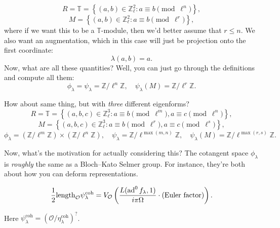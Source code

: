 \documentclass[reqno]{amsart} 
\begin{document}
\begin{example}
  \begin{equation*}
    R = \mathbb{T} = \left\{(a, b) \in \mathbb{Z}_{\ell}^2 : a \equiv b \pmod{\ell^n} \right\},
  \end{equation*}
  \begin{equation*}
    M = \left\{(a, b) \in \mathbb{Z}_{\ell}^2 : a \equiv b \pmod{\ell^r} \right\},
  \end{equation*}
  where if we want this to be a $\mathbb{T}$-module, then we'd better assume that $r \leq n$.  We also want an augmentation, which in this case will just be projection onto the first coordinate:
  \begin{equation*}
    \lambda(a, b) = a.
  \end{equation*}
  Now, what are all these quantities?  Well, you can just go through the definitions and compute all them:
  \begin{equation*}
    \phi_\lambda = \psi_\lambda = \mathbb{Z} / \ell^n \mathbb{Z}, \quad
    \psi_\lambda(M) = \mathbb{Z} / \ell^r \mathbb{Z}.
  \end{equation*}
\end{example}
\begin{example}\label{example:cnppk96xx5}
  How about same thing, but with \emph{three} different eigenforms?
  \begin{equation*}
    R = \mathbb{T} = \left\{(a, b, c) \in \mathbb{Z}_{\ell}^3 :
      a \equiv b \pmod{\ell^m }, a \equiv c \pmod{\ell^n}\right\},
  \end{equation*}
  \begin{equation*}
    M = \left\{(a, b, c) \in \mathbb{Z}_{\ell}^3 :
      a \equiv b \pmod{\ell^r }, a \equiv c \pmod{\ell^s}\right\},
  \end{equation*}
  \begin{equation*}
    \phi_\lambda =(\mathbb{Z} / \ell^m \mathbb{Z}) \times(\mathbb{Z} / \ell^n \mathbb{Z}), \quad
    \psi_\lambda = \mathbb{Z} / \ell^{\max(m, n)} \mathbb{Z}, \quad
    \psi_\lambda(M) = \mathbb{Z} / \ell^{\max(r, s)} \mathbb{Z}.
  \end{equation*}
\end{example}
Now, what's the motivation for actually considering this?  The cotangent space $\phi_\lambda$ is \emph{roughly} the same as a Bloch--Kato Selmer group.  For instance, they're both about how you can deform representations.

\begin{theorem}[Hida '81]
  \begin{equation*}
    \frac{1}{2} \mathrm{length}_{\mathcal{O}} \psi_\lambda^{\mathrm{coh}}
    = V_{\mathcal{O}}
    \left( \frac{L(\operatorname{ad}^0 f_\lambda, 1)}{i \pi \Omega}
      \cdot(\text{Euler factor})\right).
  \end{equation*}
\end{theorem}
Here $\psi_\lambda^{\mathrm{coh}} =(\mathcal{O} / \eta_\lambda^{\mathrm{coh}})^?$.
\end{document}
